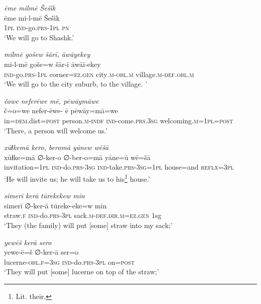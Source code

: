 \ea \label{HB.32}
\textit{ēme milmē Šešìk} \\ 
\gll ēme mi-l-mē Šešìk \\ 
 \textsc{1pl} \textsc{ind-}go\textsc{.prs}\textsc{-1pl} \textsc{pn} \\ 
\glt `We will go to Shashk.'
\z 
 
\ea \label{HB.33}
\textit{milmē gošew šārī, āwāyekey} \\ 
\gll mi-l-mē goše=w šār-ī āwāī-ekey \\ 
 \textsc{ind-}go\textsc{.prs}\textsc{-1pl} corner\textsc{=ez}\textsc{.gen} city\textsc{.m}\textsc{-obl}\textsc{.m} village\textsc{.m}\textsc{-def}\textsc{.obl}\textsc{.m} \\ 
\glt `We will go to the city suburb, to the village. '
\z 
 
\ea \label{HB.34}
\textit{čowe neferēwe mē, pēwāymāwe} \\ 
\gll č=o=we nefer-ēwe- ē pēwāy=mā=we \\ 
 in\textsc{=dem}.dist\textsc{=\textsc{post}} person\textsc{.m}\textsc{-indf} \textsc{ind-}come\textsc{.prs}\textsc{.3sg} welcoming\textsc{.m}\textsc{=1pl}\textsc{=\textsc{post}} \\ 
\glt `There, a person will welcome us.'
\z 
 
\ea \label{HB.35}
\textit{xūɫkemā kero, beromā yānew wēšā} \\ 
\gll xūɫke=mā ∅-ker-o ∅-ber-o=mā yāne=ū wē=šā \\ 
 invitation\textsc{=1pl} \textsc{ind-}do\textsc{.prs}\textsc{-3sg} \textsc{ind-}take\textsc{.prs}\textsc{-3sg}\textsc{=1pl} house=and \textsc{reflx}\textsc{=3pl} \\ 
\glt `He will invite us; he will take us to his\footnote{Lit. their.} house.'
\z 
 
\ea \label{HB.36}
\textit{simerī kerā tūrekekew min} \\ 
\gll simerī ∅-ker-ā tūreke-eke=w min \\ 
 straw\textsc{\textsc{.f}} \textsc{ind-}do\textsc{.prs}\textsc{-3pl} sack\textsc{.m}\textsc{-def}\textsc{.dir}\textsc{.m}\textsc{=ez}\textsc{.gen} 1sg \\ 
\glt `They (the family) will put [some] straw into my sack;'
\z 
 
\ea \label{HB.37}
\textit{yewēš kerā sero} \\ 
\gll yewe-ē=š ∅-ker-ā ser=o \\ 
 lucerne\textsc{-obl}\textsc{\textsc{.f}}\textsc{=3sg} \textsc{ind-}do\textsc{.prs}\textsc{-3pl} on\textsc{=\textsc{post}} \\ 
\glt `They will put [some] lucerne on top of the straw;'
\z 
 
